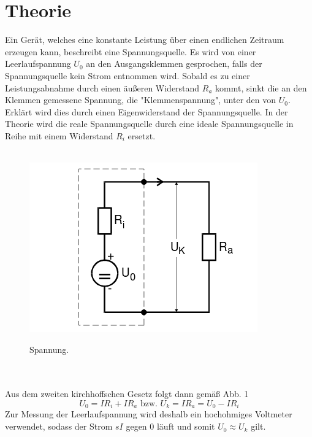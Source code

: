 \section{Theorie}
\label{sec:Theorie}

Ein Gerät, welches eine konstante Leistung über
einen endlichen Zeitraum erzeugen kann, beschreibt eine Spannungsquelle. Es wird von einer Leerlaufspannung $ U_0 $
an den Ausgangsklemmen gesprochen, falls der Spannungsquelle kein Strom entnommen wird.
Sobald es zu einer Leistungsabnahme durch einen äußeren Widerstand $ R_a $ kommt,
sinkt die an den Klemmen gemessene Spannung, die "Klemmenspannung", unter den von $ U_0 $. Erklärt wird
dies durch einen Eigenwiderstand der Spannungsquelle. In der Theorie wird die reale
Spannungsquelle durch eine ideale Spannungsquelle in Reihe mit einem Widerstand $ R_i$
ersetzt.
\\
\\
\begin{figure}[H]
  \centering
  \caption{Spannung.}
  \includegraphics[width=\linewidth-150pt,height=\textheight-150pt,keepaspectratio]{Spannungsquelle1.png}
  \label{fig:Spannung1}
\end{figure}

\\
\\
Aus dem zweiten kirchhoffschen Gesetz folgt dann gemäß Abb. 1
\begin{equation}
	 U_0 = I R_i + I R_a  \text{ bzw. } U_k = I R_a = U_0-IR_i
\end{equation}
Zur Messung der Leerlaufspannung wird deshalb ein hochohmiges Voltmeter verwendet,
sodass der Strom $sI$ gegen $0$ läuft und somit $ U_0 \approx U_k$ gilt.
